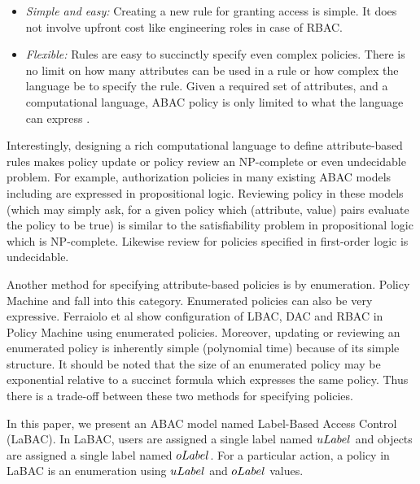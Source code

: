 \begin{itemize}
	\item \emph{Simple and easy:} Creating a new rule for granting access is simple. It does not involve upfront cost like engineering roles in case of RBAC.
	
	\item \emph{Flexible:} Rules are easy to succinctly specify even complex policies. There is no limit on how many attributes can be used in a rule or how complex the language be to specify the rule. Given a required set of attributes, and a computational language, ABAC policy is only limited to what the language can express \cite{nist-abac-draft}.
\end{itemize}

Interestingly, designing a rich computational language to define attribute-based rules makes policy update or policy review an NP-complete or even undecidable problem. For example, authorization policies in many existing ABAC models including \cite{abacAlpha, hgabac, abac-for-web-service} are expressed  in propositional logic. Reviewing policy in these models (which may simply ask, for a given policy  which (attribute, value) pairs evaluate the policy to be true) is similar to the satisfiability problem in propositional logic which is NP-complete. Likewise review for policies specified in first-order logic is undecidable.

Another method for specifying attribute-based policies is by enumeration. Policy Machine \cite{policy-machine} and \twoSortedRBAC{} \cite{two-sorted-rbac} fall into this category. Enumerated policies  can also be very expressive. Ferraiolo et al \cite{policy-machine} show configuration of LBAC, DAC and RBAC in Policy Machine using enumerated policies.  Moreover, updating or reviewing an enumerated policy is inherently simple (polynomial time) because of its simple structure.  It should be noted that the size of an enumerated policy may be exponential relative to a succinct formula which expresses the same policy.  Thus there is a trade-off between these two methods for specifying policies.

In this paper, we present an ABAC model named Label-Based Access Control (LaBAC). In LaBAC, users are assigned a single label named $uLabel$ and objects are assigned a single label named $oLabel$. For a particular action, a policy in LaBAC is an enumeration using $uLabel$ and $oLabel$ values.


